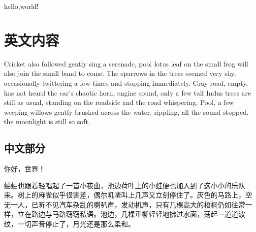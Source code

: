 \documentclass[UTF8]{CUC}
\begin{document}
hello,world!

\section{英文内容}

Cricket also followed gently sing a serenade, pool lotus leaf on the small frog will also join the small band to come. The sparrows in the trees seemed very shy, occasionally twittering a few times and stopping immediately. Gray road, empty, has not heard the car's chaotic horn, engine sound, only a few tall Indus trees are still as usual, standing on the roadside and the road whispering. Pool, a few weeping willows gently brushed across the water, rippling, all the sound stopped, the moonlight is still so soft.

\subsection{中文部分}
你好，世界！

蛐蛐也跟着轻唱起了一首小夜曲，池边荷叶上的小蛙便也加入到了这小小的乐队来。树上的麻雀似乎很害羞，偶尔叽喳叫上几声又立刻停住了。灰色的马路上，空无一人，已听不见汽车杂乱的喇叭声，发动机声，只有几棵高大的梧桐仍如往常一样，立在路边与马路窃窃私语。池边，几棵垂柳轻轻地拂过水面，荡起一道道波纹，一切声音停止了，月光还是那么柔和。
\end{document}
